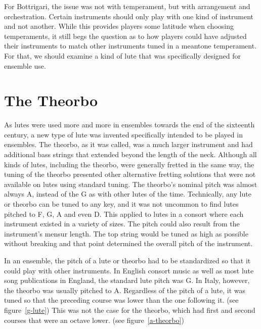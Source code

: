 For Bottrigari, the issue was not with temperament, but with arrangement and
orchestration.  Certain instruments should only play with one kind of instrument
and not another.  While this provides players some latitude when choosing temperaments,
it still begs the question as to how players could have adjusted their instruments
to match other instruments tuned in a meantone temperament.  For that, we should
examine a kind of lute that was specifically designed for ensemble use.

\section{The Theorbo}

As lutes were used more and more in ensembles towards the end of the sixteenth century, a new type
of lute was invented specifically intended to be played in ensembles.  The theorbo, as it was
called, was a much larger instrument and had additional bass strings that extended beyond the length
of the neck.  Although all kinds of lutes, including the theorbo, were generally fretted in the same
way, the tuning of the theorbo presented other alternative fretting solutions that were not
available on lutes using standard tuning.  The theorbo's nominal pitch was almost always A, instead
of the G as with other lutes of the time.  Technically, any lute or theorbo can be tuned to any
key, and it was not uncommon to find lutes pitched to F, G, A and even D.  This applied to lutes in
a consort where each instrument existed in a variety of sizes.  The pitch could also result from the
instrument's mensur length.  The top string would be tuned as high as possible without breaking and
that point determined the overall pitch of the instrument.

In an ensemble, the pitch of a lute or theorbo had to be
standardized so that it could play with other instruments.  In English consort music as
well as most lute song publications in England, the standard lute pitch was G.
In Italy, however, the theorbo was usually pitched to A.  Regardless of the pitch of a
lute, it was tuned so that the preceding course was lower than the one
following it. (see figure~\ref{g-lute})  This was not the case for the theorbo, which
had first and second courses that were an octave lower. (see figure~\ref{a-theorbo})

